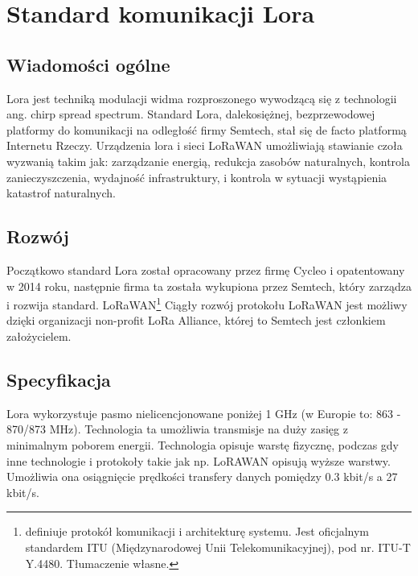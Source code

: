 \newpage %
\section{Standard komunikacji Lora}
\subsection{Wiadomości ogólne}
Lora\cite{lora} jest techniką modulacji widma rozproszonego wywodzącą się z technologii ang. chirp spread spectrum.
Standard Lora, dalekosiężnej, bezprzewodowej platformy do komunikacji na odległość firmy Semtech, stał się de facto platformą Internetu Rzeczy.
Urządzenia lora i sieci LoRaWAN umożliwiają stawianie czoła wyzwanią takim jak: zarządzanie energią, redukcja zasobów naturalnych, kontrola zanieczyszczenia, wydajność infrastruktury, i kontrola w sytuacji wystąpienia katastrof naturalnych.
\subsection{Rozwój}
Początkowo standard Lora został opracowany przez firmę Cycleo i opatentowany w 2014 roku, następnie firma ta została wykupiona przez Semtech, który zarządza i rozwija standard.
LoRaWAN\footnote{definiuje protokół komunikacji i architekturę systemu. Jest oficjalnym standardem ITU (Międzynarodowej Unii Telekomunikacyjnej), pod nr. ITU-T Y.4480. Tłumaczenie własne.}
Ciągły rozwój protokołu LoRaWAN jest możliwy dzięki organizacji non-profit LoRa Alliance, której to Semtech jest członkiem założycielem.
\subsection{Specyfikacja}
Lora wykorzystuje pasmo nielicencjonowane poniżej 1 GHz (w Europie to: 863 - 870/873 MHz). Technologia ta umożliwia transmisje na duży zasięg z minimalnym poborem energii. Technologia opisuje warstę fizycznę, podczas gdy inne technologie i protokoły takie jak np. LoRAWAN opisują wyższe warstwy. Umożliwia ona osiągnięcie prędkości transfery danych pomiędzy 0.3 kbit/s a 27 kbit/s.
